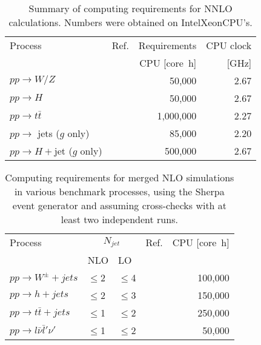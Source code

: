 \begin{table}
  \centering
  \begin{tabular}{llrr}
    \hline
    Process & Ref. & Requirements & CPU clock\\
    & & CPU [core~h] & [GHz]\\
    \hline\hline
    $pp\to W/Z$ & \cite{Melnikov:2006di,Li:2012wna} & 50,000 & 2.67 \\
    $pp\to H$ & \cite{Anastasiou:2005qj} & 50,000 & 2.67 \\
    $pp\to t\bar{t}$ & \cite{Baernreuther:2012ws,Czakon:2013goa} & 1,000,000 & 2.27\\
    $pp\to $ jets ($g$ only) & \cite{Ridder:2013mf} & 85,000 & 2.20 \\
    $pp\to H+$jet ($g$ only) & \cite{Boughezal:2013uia} & 500,000 & 2.67 \\
    \hline
  \end{tabular}
  \caption{Summary of computing requirements for NNLO calculations.
    Numbers were obtained on Intel\registered Xeon\registered CPU's.
    \label{tab:nnlo_requirements}}
\end{table}

\begin{table}
  \centering
  \begin{tabular}{llllr}
    \hline
    Process & \multicolumn{2}{c}{$N_{jet}$} & Ref. & CPU [core~h] \\
    & NLO & LO & & \\
    \hline\hline
    $pp\to W^\pm+jets$ & $\le$2 & $\le$4 & \cite{Hoeche:2012yf} & 100,000 \\
    $pp\to h+jets$ & $\le$2 & $\le$3 & \cite{Hoeche:2013xxx} & 150,000 \\
    $pp\to t\bar{t}+jets$ & $\le$1 & $\le$2 & \cite{Hoeche:2013mua} & 250,000 \\
    $pp\to l\bar{\nu}\bar{l}'\nu'$ & $\le$1 & $\le$2 & \cite{Cascioli:2013xxx} & 50,000 \\
    \hline
  \end{tabular}
  \caption{Computing requirements for merged NLO simulations in
    various benchmark processes, using the Sherpa event generator
    and assuming cross-checks with at least two independent runs.
    \label{tab:nlo_merging}}
\end{table}

